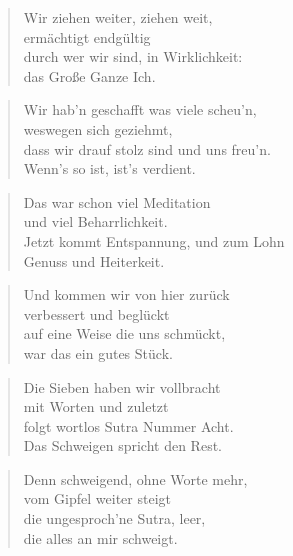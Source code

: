 \documentclass[10pt,a4paper]{article}
\begin{document}
\begin{multicols}{2}
\begin{verse}
Wir ziehen weiter, ziehen weit, \\
ermächtigt endgültig \\
durch wer wir sind, in Wirklichkeit: \\
das Große Ganze Ich. \\
\end{verse}

\begin{verse}
Wir hab’n geschafft was viele scheu’n, \\
weswegen sich geziehmt, \\
dass wir drauf stolz sind und uns freu’n. \\
Wenn’s so ist, ist’s verdient. \\
\end{verse}

\begin{verse}
Das war schon viel Meditation \\
und viel Beharrlichkeit. \\
Jetzt kommt Entspannung, und zum Lohn \\
Genuss und Heiterkeit. \\
\end{verse}

\begin{verse}
Und kommen wir von hier zurück \\
verbessert und beglückt \\
auf eine Weise die uns schmückt, \\
war das ein gutes Stück. \\
\end{verse}

\begin{verse}
Die Sieben haben wir vollbracht \\
mit Worten und zuletzt \\
folgt wortlos Sutra Nummer Acht. \\
Das Schweigen spricht den Rest. \\
\end{verse}

\begin{verse}
Denn schweigend, ohne Worte mehr, \\
vom Gipfel weiter steigt \\
die ungesproch’ne Sutra, leer, \\
die alles an mir schweigt. \\
\end{verse}

\end{multicols}
\end{document}
